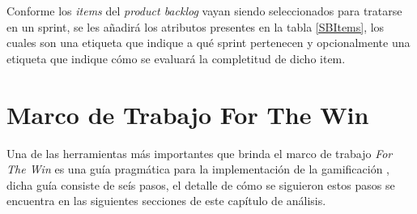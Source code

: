  \noindent Conforme los {\it items} del {\it product backlog} vayan siendo seleccionados para
 tratarse en un sprint, se les añadirá los atributos presentes en la tabla \ref{SBItems}, los
 cuales son una etiqueta que indique a qué sprint pertenecen y opcionalmente una etiqueta que
 indique cómo se evaluará la completitud de dicho item.



\section{Marco de Trabajo For The Win}
\label{analisis:forthewin}

 Una de las herramientas más importantes que brinda el marco de trabajo {\it For The Win} es
 una guía pragmática para la implementación de la gamificación \cite[p. 8]{ForTheWin}, dicha guía consiste de seís
 pasos, el detalle de cómo se siguieron estos pasos se encuentra en las siguientes secciones
 de este capítulo de análisis.

